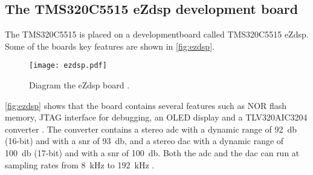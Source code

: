 \subsection{The TMS320C5515 eZdsp development board}
The TMS320C5515 is placed on a developmentboard called TMS320C5515 eZdsp. Some of the boards key features are shown in \autoref{fig:ezdsp}.

\begin{figure}[!h]
    \centering
        \texttt{[image: ezdsp.pdf]}
        \caption{Diagram the eZdsp board \cite{ezdsp}.}
        \label{fig:ezdsp}
  \end{figure}

\autoref{fig:ezdsp} shows that the board contains several features such as NOR flash memory, JTAG interface for debugging, an OLED display and a TLV320AIC3204 converter \cite{ezdsp}.  
The converter contains a stereo \gls{adc} with a dynamic range of \SI{92}{\decibel} (16-bit) and with a \gls{snr} of \SI{93}{\decibel}, and a stereo \gls{dac} with a dynamic range of \SI{100}{\decibel} (17-bit) and with a \gls{snr} of \SI{100}{\decibel}. Both the \gls{adc} and the \gls{dac} can run at sampling rates from \SI{8}{\kilo\hertz} to \SI{192}{\kilo\hertz} \cite{TLV320AIC3204}.

